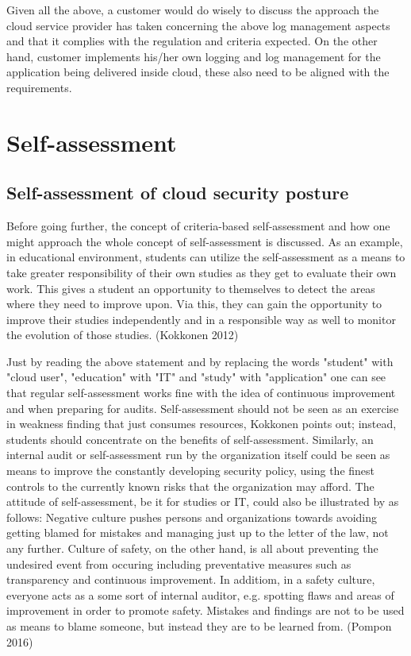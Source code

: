 \documentclass{article}
\begin{document}
\par
Given all the above, a customer would do wisely to discuss the approach the cloud service provider has taken concerning the above log management aspects and that it complies with the regulation and criteria expected. On the other hand, customer implements his/her own logging and log management for the application being delivered inside cloud, these also need to be aligned with the requirements.
\section{Self-assessment}
\subsection{Self-assessment of cloud security posture}
Before going further, the concept of criteria-based self-assessment and how one might approach the whole concept of self-assessment is discussed. 
As an example, in educational environment, students can utilize the self-assessment as a means to take greater responsibility of their own studies as they get to evaluate their own work. This gives a student an opportunity to themselves to detect the areas where they need to improve upon.
Via this, they can gain the opportunity to improve their studies independently and in a responsible way as well to monitor the evolution of those studies. (Kokkonen 2012)
\par
Just by reading the above statement and by replacing the words "student" with "cloud user", "education" with "IT" and "study" with "application" one can see that regular self-assessment works fine with the idea of continuous improvement and when preparing for audits.
Self-assessment should not be seen as an exercise in weakness finding that just consumes resources, Kokkonen points out; instead, students should concentrate on the benefits of self-assessment.
Similarly, an internal audit or self-assessment run by the organization itself could be seen as means to improve the constantly developing security policy, using the finest controls to the currently known risks that the organization may afford.
The attitude of self-assessment, be it for studies or IT, could also be illustrated by as follows: Negative culture pushes persons and organizations towards avoiding getting blamed for mistakes and managing just up to the letter of the law, not any further.
Culture of safety, on the other hand, is all about preventing the undesired event from occuring including preventative measures such as transparency and continuous improvement. In additiom, in a safety culture, everyone acts as a some sort of internal auditor, e.g. spotting flaws and areas of improvement in order to promote safety. Mistakes and findings are not to be used as means to blame someone, but instead they are to be learned from. (Pompon 2016)
\end{document}
